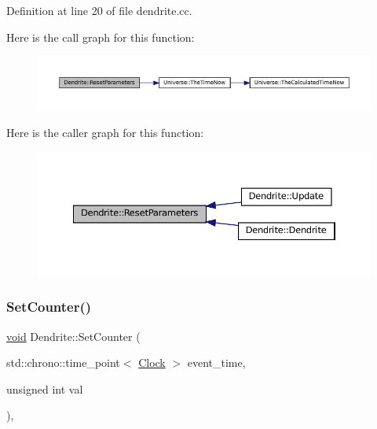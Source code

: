 Definition at line 20 of file dendrite.\+cc.

Here is the call graph for this function\+:\nopagebreak
\begin{figure}[H]
\begin{center}
\leavevmode
\includegraphics[width=350pt]{class_dendrite_a6a6290955348051819badb801b753901_cgraph}
\end{center}
\end{figure}
Here is the caller graph for this function\+:\nopagebreak
\begin{figure}[H]
\begin{center}
\leavevmode
\includegraphics[width=350pt]{class_dendrite_a6a6290955348051819badb801b753901_icgraph}
\end{center}
\end{figure}
\mbox{\label{class_dendrite_a7529495515de74fff2b9a92b12531057}} 
\subsubsection{\texorpdfstring{Set\+Counter()}{SetCounter()}}
{\footnotesize\ttfamily \mbox{\hyperlink{glad_8h_a950fc91edb4504f62f1c577bf4727c29}{void}} Dendrite\+::\+Set\+Counter (\begin{DoxyParamCaption}\item[{std\+::chrono\+::time\+\_\+point$<$ \mbox{\hyperlink{universe_8h_a0ef8d951d1ca5ab3cfaf7ab4c7a6fd80}{Clock}} $>$}]{event\+\_\+time,  }\item[{unsigned int}]{val }\end{DoxyParamCaption})\hspace{0.3cm}{\ttfamily [inline]}, {\ttfamily [virtual]}}



